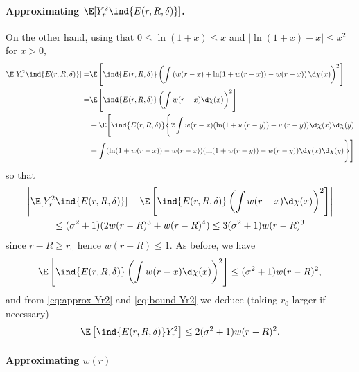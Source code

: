 \documentclass[10pt,a4paper]{article}
\begin{document}
\paragraph{Approximating $\E[Y_r^2 \ind{E(r,R,\delta)}]$.}

On the other hand, using that $0\leq \ln(1+x) \leq x$ and $|\ln(1+x)-x| \leq x^2$ for $x>0$, 
\begin{align*}
\E[Y_r^2 \ind{E(r,R,\delta)}] =& \E\left[\ind{E(r,R,\delta)} \left(\int \left( w(r-x) + \ln(1+w(r-x)) - w(r-x) \right) \d \chi(x)\right)^2 \right] \\
=& \E\left[\ind{E(r,R,\delta)} \left(\int w(r-x) \d\chi(x) \right)^2\right] \\
&+ \E\Bigg[\ind{E(r,R,\delta)} \Bigg\{ 2\int w(r-x) (\ln(1+w(r-y))-w(r-y)) \d\chi(x)\d\chi(y) \\
&+ \int (\ln(1+w(r-x))-w(r-x)) (\ln(1+w(r-y))-w(r-y)) \d\chi(x)\d\chi(y) \Bigg\} \Bigg]
\end{align*}
so that 
\begin{multline}\label{eq:approx-Yr2}
\left| \E[Y_r^2 \ind{E(r,R,\delta)}] - \E\left[\ind{E(r,R,\delta)} \left(\int w(r-x) \d\chi(x) \right)^2\right] \right| \\
 \leq (\sigma^2 +1) (2w(r-R)^3 + w(r-R)^4) \leq 3 (\sigma^2 +1) w(r-R)^3
\end{multline}
since $r-R \geq r_0$ hence $w(r-R)\leq 1$. 
As before, we have
\begin{equation}\label{eq:bound-Yr2}
\E\left[\ind{E(r,R,\delta)} \left(\int w(r-x) \d\chi(x) \right)^2\right] \leq (\sigma^2 +1) w(r-R)^2 ,
\end{equation}
and from \eqref{eq:approx-Yr2} and \eqref{eq:bound-Yr2} we deduce (taking $r_0$ larger if necessary)
\begin{equation*}
\E\left[\ind{E(r,R,\delta)} Y_r^2 \right] \leq 2(\sigma^2 + 1) w(r-R)^2 .
\end{equation*}


\paragraph{Approximating $w(r)$}
\end{document}
